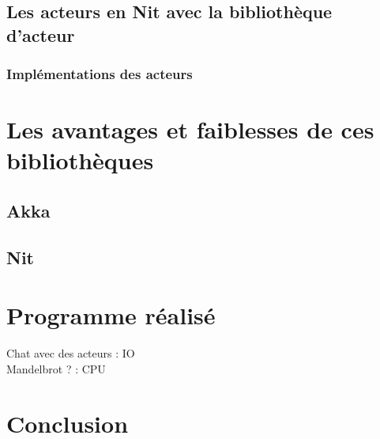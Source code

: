 \documentclass[12pt, a4paper]{article}
\begin{document}
\subsection{Les acteurs en Nit avec la bibliothèque d'acteur}

\subsubsection{Implémentations des acteurs}


\section{Les avantages et faiblesses de ces bibliothèques}

\subsection{Akka}

\subsection{Nit}


\section{Programme réalisé}
Chat avec des acteurs  : IO\\
Mandelbrot ? : CPU\\

\section{Conclusion}


\end{document}
